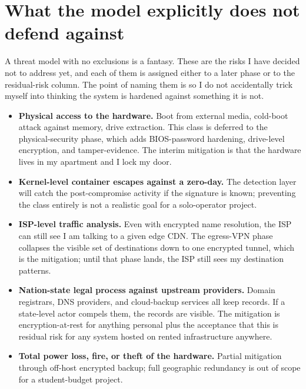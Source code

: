 \documentclass[12pt]{article}
\begin{document}
\section{What the model explicitly does not defend against}

A threat model with no exclusions is a fantasy. These are the risks I have decided not to address yet, and each of them is assigned either to a later phase or to the residual-risk column. The point of naming them is so I do not accidentally trick myself into thinking the system is hardened against something it is not.

\begin{itemize}[leftmargin=18pt,itemsep=2pt]
  \item \textbf{Physical access to the hardware.} Boot from external media, cold-boot attack against memory, drive extraction. This class is deferred to the physical-security phase, which adds BIOS-password hardening, drive-level encryption, and tamper-evidence. The interim mitigation is that the hardware lives in my apartment and I lock my door.
  \item \textbf{Kernel-level container escapes against a zero-day.} The detection layer will catch the post-compromise activity if the signature is known; preventing the class entirely is not a realistic goal for a solo-operator project.
  \item \textbf{ISP-level traffic analysis.} Even with encrypted name resolution, the ISP can still see I am talking to a given edge CDN. The egress-VPN phase collapses the visible set of destinations down to one encrypted tunnel, which is the mitigation; until that phase lands, the ISP still sees my destination patterns.
  \item \textbf{Nation-state legal process against upstream providers.} Domain registrars, DNS providers, and cloud-backup services all keep records. If a state-level actor compels them, the records are visible. The mitigation is encryption-at-rest for anything personal plus the acceptance that this is residual risk for any system hosted on rented infrastructure anywhere.
  \item \textbf{Total power loss, fire, or theft of the hardware.} Partial mitigation through off-host encrypted backup; full geographic redundancy is out of scope for a student-budget project.

\end{itemize}
\end{document}
